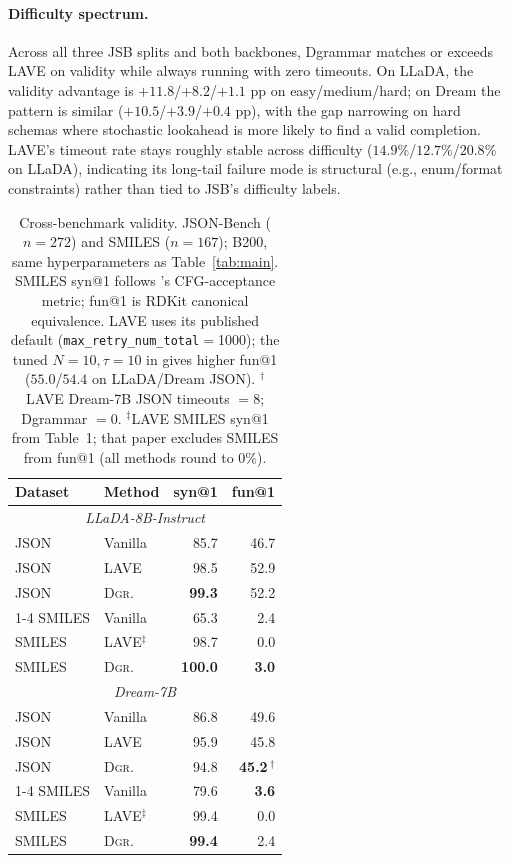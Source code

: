 \documentclass[11pt]{article}
\begin{document}
\paragraph{Difficulty spectrum.} Across all three JSB splits and both backbones, Dgrammar matches or exceeds LAVE on validity while always running with zero timeouts. On LLaDA, the validity advantage is $+11.8$/$+8.2$/$+1.1$ pp on easy/medium/hard; on Dream the pattern is similar ($+10.5$/$+3.9$/$+0.4$ pp), with the gap narrowing on hard schemas where stochastic lookahead is more likely to find a valid completion. LAVE's timeout rate stays roughly stable across difficulty ($14.9\%$/$12.7\%$/$20.8\%$ on LLaDA), indicating its long-tail failure mode is structural (e.g., enum/format constraints) rather than tied to JSB's difficulty labels.

\begin{table}[!htbp]
\small
\centering
\setlength{\tabcolsep}{4pt}
\begin{tabular}{llrr}
\toprule
\textbf{Dataset} & \textbf{Method} & \textbf{syn@1} & \textbf{fun@1} \\
\midrule
\multicolumn{4}{c}{\textit{LLaDA-8B-Instruct}} \\
\midrule
JSON   & Vanilla       & 85.7          & 46.7 \\
JSON   & LAVE          & 98.5          & 52.9 \\
JSON   & \textsc{Dgr.} & \textbf{99.3} & 52.2 \\
\cmidrule(lr){1-4}
SMILES & Vanilla       & 65.3          & 2.4 \\
SMILES & LAVE$^{\!\ddagger}$ & 98.7    & 0.0 \\
SMILES & \textsc{Dgr.} & \textbf{100.0} & \textbf{3.0} \\
\midrule
\multicolumn{4}{c}{\textit{Dream-7B}} \\
\midrule
JSON   & Vanilla       & 86.8          & 49.6 \\
JSON   & LAVE          & 95.9          & 45.8 \\
JSON   & \textsc{Dgr.} & 94.8          & \textbf{45.2}\,$^{\!\dagger}$ \\
\cmidrule(lr){1-4}
SMILES & Vanilla       & 79.6          & \textbf{3.6} \\
SMILES & LAVE$^{\!\ddagger}$ & 99.4    & 0.0 \\
SMILES & \textsc{Dgr.} & \textbf{99.4} & 2.4 \\
\bottomrule
\end{tabular}
\caption{Cross-benchmark validity. JSON-Bench ($n{=}272$) and SMILES ($n{=}167$); B200, same hyperparameters as Table~\ref{tab:main}. SMILES syn@1 follows \citet{lave2025}'s CFG-acceptance metric; fun@1 is RDKit canonical equivalence. LAVE uses its published default (\texttt{max\_retry\_num\_total}$=$1000); the tuned $N{=}10,\tau{=}10$ in \citet{lave2025} gives higher fun@1 ($55.0$/$54.4$ on LLaDA/Dream JSON). $^{\dagger}$LAVE Dream-7B JSON timeouts $=8$; Dgrammar $=0$. $^{\ddagger}$LAVE SMILES syn@1 from \citet{lave2025} Table~1; that paper excludes SMILES from fun@1 (all methods round to $0\%$).}
\label{tab:cross}
\end{table}
\end{document}
